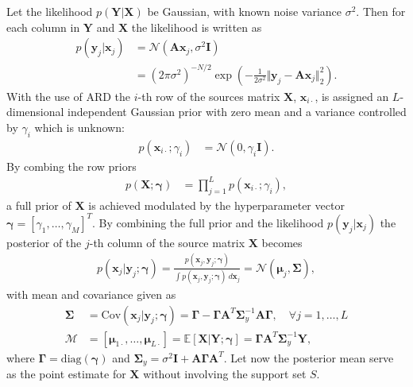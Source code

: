Let the likelihood $p(\mathbf{Y} \vert \mathbf{X})$ be Gaussian, with known noise variance $\sigma^2$. 
Then for each column in $\mathbf{Y}$ and $\mathbf{X}$ the likelihood is written as
\begin{align*}
p(\mathbf{y}_{j} \vert \mathbf{x}_{j}) &= \mathcal{N}(\mathbf{Ax}_{j}, \sigma^2 \mathbf{I}) \\
&= (2 \pi \sigma^2)^{-N/2} \exp \left( - \frac{1}{2 \sigma^2} \Vert \mathbf{y}_{j} - \mathbf{A} \mathbf{x}_{j} \Vert_2^2 \right).
\end{align*}
With the use of ARD the $i$-th row of the sources matrix $\mathbf{X}$, $\mathbf{x}_{i \cdot}$, is assigned an $L$-dimensional independent Gaussian prior with zero mean and a variance controlled by $\gamma_i$ which is unknown:
\begin{align*}
p (\mathbf{x}_{i \cdot} ; \gamma_i) &= \mathcal{N}(0, \gamma_i \mathbf{I}).
\end{align*}
By combing the row priors
\begin{align*}
p (\mathbf{X} ; \boldsymbol{\gamma}) &= \prod_{j=1}^L p (\mathbf{x}_{i \cdot} ; \gamma_i),
\end{align*}
a full prior of $\mathbf{X}$ is achieved modulated by the hyperparameter vector $\boldsymbol{\gamma} = [\gamma_1, \dots, \gamma_M]^T$. 
By combining the full prior and the likelihood $p(\mathbf{y}_{j} \vert \mathbf{x}_{j})$ the posterior of the $j$-th column of the source matrix $\mathbf{X}$ becomes
\begin{align*}
p(\mathbf{x}_{j} \vert \mathbf{y}_{j} ; \boldsymbol{\gamma}) = \frac{p(\mathbf{x}_{j}, \mathbf{y}_{j} ; \boldsymbol{\gamma})}{\int p(\mathbf{x}_{j}, \mathbf{y}_{j} ; \boldsymbol{\gamma}) \ d \mathbf{x}_{j}} = \mathcal{N}(\boldsymbol{\mu}_{j}, \boldsymbol{\Sigma}),
\end{align*}
with mean and covariance given as
\begin{align}
\boldsymbol{\Sigma} &= \text{Cov}(\mathbf{x}_{j} \vert \mathbf{y}_{j} ; \boldsymbol{\gamma}) = \boldsymbol{\Gamma} - \boldsymbol{\Gamma} \mathbf{A}^T \boldsymbol{\Sigma}_y^{-1} \mathbf{A} \boldsymbol{\Gamma}, \quad \forall j = 1, \dots, L \nonumber \\
\mathcal{M} &= [\boldsymbol{\mu}_{1 \cdot}, \dots, \boldsymbol{\mu}_{ L \cdot}] = \mathbb{E}[\mathbf{X} \vert \mathbf{Y} ; \boldsymbol{\gamma}] = \boldsymbol{\Gamma} \mathbf{A}^T \boldsymbol{\Sigma}_y^{-1} \mathbf{Y}, \label{eq:moments}
\end{align}
where $\boldsymbol{\Gamma} = \text{diag}(\boldsymbol{\gamma})$ and $\boldsymbol{\Sigma}_y = \sigma^2 \mathbf{I} + \mathbf{A} \boldsymbol{\Gamma} \mathbf{A}^T$. Let now the posterior mean serve as the point estimate for $\mathbf{X}$ without involving the support set $S$.
